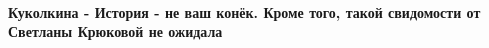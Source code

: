  
 
 
 
 
\paragraph{Куколкина - История - не ваш конёк. Кроме того, такой свидомости от Светланы Крюковой не ожидала}
\label{sec:14_07_2021.fb.krjukova_svetlana.1.statja_putina_mnenie.cmt.kukolkina_istoria_konek}


